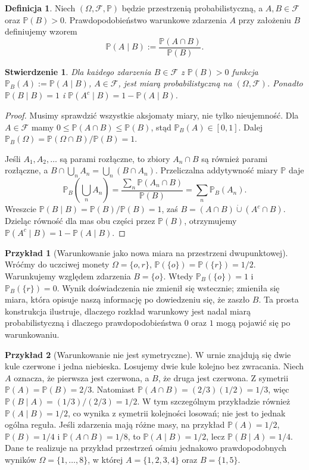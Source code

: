 \documentclass[11pt,a4paper,oneside]{report}
\numberwithin{equation}{chapter}
\theoremstyle{plain}
\newtheorem{stwierdzenie}[twierdzenie]{Stwierdzenie}
\theoremstyle{definition}
\newtheorem{definicja}{Definicja}[chapter]
\newtheorem{przyklad}{Przykład}[chapter]
\theoremstyle{remark}
\newcommand{\Prob}{\mathbb{P}}
\begin{document}
\begin{definicja}
Niech $(\Omega,\mathcal F,\Prob)$ będzie przestrzenią probabilistyczną,
a $A,B\in\mathcal F$ oraz $\Prob(B)>0$.
Prawdopodobieństwo warunkowe zdarzenia $A$ przy założeniu $B$
definiujemy wzorem
\begin{equation}\label{eq:cond}
\Prob(A\mid B):=\frac{\Prob(A\cap B)}{\Prob(B)}.
\end{equation}
\end{definicja}

\begin{stwierdzenie}
Dla każdego zdarzenia $B\in\mathcal F$ z $\Prob(B)>0$
funkcja $\Prob_B(A):=\Prob(A\mid B)$, $A\in\mathcal F$,
jest miarą probabilistyczną na $(\Omega,\mathcal F)$.
Ponadto $\Prob(B\mid B)=1$ i $\Prob(A^c\mid B)=1-\Prob(A\mid B)$.
\end{stwierdzenie}
\begin{proof}
Musimy sprawdzić wszystkie aksjomaty miary, nie tylko
nieujemność. Dla $A\in\mathcal F$ mamy
$0\leq\Prob(A\cap B)\leq\Prob(B)$, stąd
$\Prob_B(A)\in[0,1]$. Dalej
$\Prob_B(\Omega)=\Prob(\Omega\cap B)/\Prob(B)=1$.

Jeśli $A_1,A_2,\ldots$ są parami rozłączne, to zbiory
$A_n\cap B$ są również parami rozłączne, a
$B\cap\bigcup_n A_n=\bigcup_n(B\cap A_n)$.
Przeliczalna addytywność miary $\Prob$ daje
\[
\Prob_B\!\left(\bigcup_n A_n\right)
=\frac{\sum_n\Prob(A_n\cap B)}{\Prob(B)}
=\sum_n\Prob_B(A_n).
\]
Wreszcie $\Prob(B\mid B)=\Prob(B)/\Prob(B)=1$, zaś
$B=(A\cap B)\mathbin{\dot\cup}(A^c\cap B)$.
Dzieląc równość dla mas obu części przez $\Prob(B)$,
otrzymujemy $\Prob(A^c\mid B)=1-\Prob(A\mid B)$.
\end{proof}


\begin{przyklad}[Warunkowanie jako nowa miara na przestrzeni dwupunktowej]
Wróćmy do uczciwej monety
$\Omega=\{o,r\}$, $\Prob(\{o\})=\Prob(\{r\})=1/2$.
Warunkujemy względem zdarzenia $B=\{o\}$.
Wtedy $\Prob_B(\{o\})=1$ i $\Prob_B(\{r\})=0$.
Wynik doświadczenia nie zmienił się wstecznie;
zmieniła się miara, która opisuje naszą informację
po dowiedzeniu się, że zaszło $B$.
Ta prosta konstrukcja ilustruje, dlaczego rozkład warunkowy
jest nadal miarą probabilistyczną i dlaczego prawdopodobieństwa
$0$ oraz $1$ mogą pojawić się po warunkowaniu.
\end{przyklad}

\begin{przyklad}[Warunkowanie nie jest symetryczne]
W urnie znajdują się dwie kule czerwone i jedna niebieska.
Losujemy dwie kule kolejno bez zwracania. Niech $A$ oznacza,
że pierwsza jest czerwona, a $B$, że druga jest czerwona.
Z symetrii $\Prob(A)=\Prob(B)=2/3$.
Natomiast
$\Prob(A\cap B)=(2/3)(1/2)=1/3$, więc
$\Prob(B\mid A)=(1/3)/(2/3)=1/2$.
W tym szczególnym przykładzie również $\Prob(A\mid B)=1/2$,
co wynika z symetrii kolejności losowań; nie jest to jednak
ogólna reguła. Jeśli zdarzenia mają różne masy, na przykład
$\Prob(A)=1/2$, $\Prob(B)=1/4$ i
$\Prob(A\cap B)=1/8$, to
$\Prob(A\mid B)=1/2$, lecz $\Prob(B\mid A)=1/4$.
Dane te realizuje na przykład przestrzeń ośmiu
jednakowo prawdopodobnych wyników $\Omega=\{1,\ldots,8\}$,
w której $A=\{1,2,3,4\}$ oraz $B=\{1,5\}$.
\end{przyklad}
\end{document}
